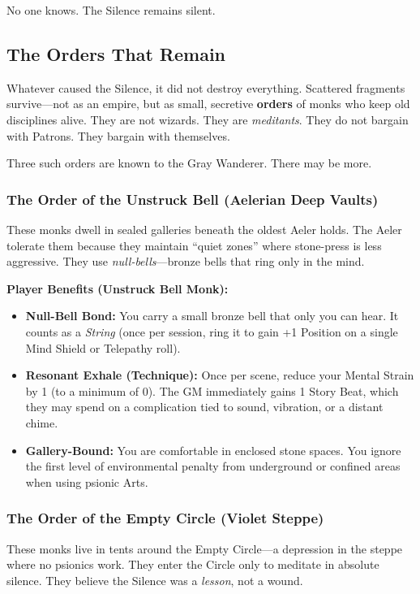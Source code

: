 \documentclass[11pt,twoside]{article}
\begin{document}
No one knows. The Silence remains silent.

\subsection*{The Orders That Remain}

Whatever caused the Silence, it did not destroy everything. Scattered fragments survive---not as an empire, but as small, secretive \textbf{orders} of monks who keep old disciplines alive. They are not wizards. They are \textit{meditants}. They do not bargain with Patrons. They bargain with themselves.

Three such orders are known to the Gray Wanderer. There may be more.

\subsubsection{The Order of the Unstruck Bell (Aelerian Deep Vaults)}

These monks dwell in sealed galleries beneath the oldest Aeler holds. The Aeler tolerate them because they maintain ``quiet zones'' where stone-press is less aggressive. They use \textit{null-bells}---bronze bells that ring only in the mind.

\textbf{Player Benefits (Unstruck Bell Monk):}
\begin{itemize}[leftmargin=*]
    \item \textbf{Null-Bell Bond:} You carry a small bronze bell that only you can hear. It counts as a \textit{String} (once per session, ring it to gain +1 Position on a single Mind Shield or Telepathy roll).
    \item \textbf{Resonant Exhale (Technique):} Once per scene, reduce your Mental Strain by 1 (to a minimum of 0). The GM immediately gains 1 Story Beat, which they may spend on a complication tied to sound, vibration, or a distant chime.
    \item \textbf{Gallery-Bound:} You are comfortable in enclosed stone spaces. You ignore the first level of environmental penalty from underground or confined areas when using psionic Arts.
\end{itemize}

\subsubsection{The Order of the Empty Circle (Violet Steppe)}

These monks live in tents around the Empty Circle---a depression in the steppe where no psionics work. They enter the Circle only to meditate in absolute silence. They believe the Silence was a \textit{lesson}, not a wound.
\end{document}
